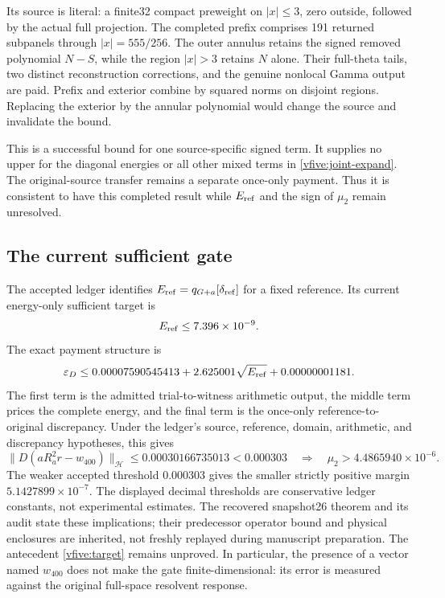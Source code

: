 \documentclass[11pt,a4paper]{article}
\numberwithin{equation}{section}
\theoremstyle{definition}\newtheorem{definition}[theorem]{Definition}
\theoremstyle{remark}\newtheorem{remark}[theorem]{Remark}
\newcommand{\Hh}{\mathcal H}\newcommand{\Hw}{\mathcal H}
\begin{document}
Its source is literal: a finite32 compact preweight on $|x|\leq3$, zero outside, followed by the actual full projection. The completed prefix comprises 191 returned subpanels through $|x|=555/256$. The outer annulus retains the signed removed polynomial $N-S$, while the region $|x|>3$ retains $N$ alone. Their full-theta tails, two distinct reconstruction corrections, and the genuine nonlocal Gamma output are paid. Prefix and exterior combine by squared norms on disjoint regions. Replacing the exterior by the annular polynomial would change the source and invalidate the bound.

This is a successful bound for one source-specific signed term. It supplies no upper for the diagonal energies or all other mixed terms in \eqref{vfive:joint-expand}. The original-source transfer remains a separate once-only payment. Thus it is consistent to have this completed result while $E_{\rm ref}$ and the sign of $\mu_2$ remain unresolved.

\subsection{The current sufficient gate}
The accepted ledger identifies $E_{\rm ref}=q_{G+a}[\delta_{\rm ref}]$ for a fixed reference. Its current energy-only sufficient target is
\begin{equation}\label{vfive:target}
 E_{\rm ref}\leq7.396\times10^{-9}.
\end{equation}
The exact payment structure is
\[
 \varepsilon_D\leq0.00007590545413+2.625001\sqrt{E_{\rm ref}}+0.00000001181.
\]
The first term is the admitted trial-to-witness arithmetic output, the middle term prices the complete energy, and the final term is the once-only reference-to-original discrepancy. Under the ledger's source, reference, domain, arithmetic, and discrepancy hypotheses, this gives
\[
 \|D(aR_a^2r-w_{400})\|_{\Hh}
 \leq0.00030166735013<0.000303
 \quad\Longrightarrow\quad \mu_2>4.4865940\times10^{-6}.
\]
The weaker accepted threshold $0.000303$ gives the smaller strictly positive margin $5.1427899\times10^{-7}$. The displayed decimal thresholds are conservative ledger constants, not experimental estimates. The recovered snapshot26 theorem and its audit state these implications; their predecessor operator bound and physical enclosures are inherited, not freshly replayed during manuscript preparation. The antecedent \eqref{vfive:target} remains unproved. In particular, the presence of a vector named $w_{400}$ does not make the gate finite-dimensional: its error is measured against the original full-space resolvent response.
\end{document}
